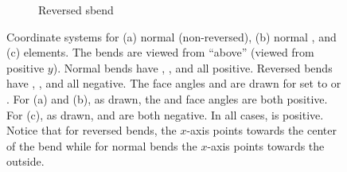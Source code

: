\begin{figure}[tb]
\begin{subfigure}[b]{0.32\textwidth}
    \caption{Reversed sbend}
    \label{f:sbend.rev}
  \end{subfigure}
  \hfill
  \caption[Coordinate systems for rbend and sbend elements.]
  { 
Coordinate systems for (a) normal (non-reversed), (b) normal , and (c)
 elements. The bends are viewed from ``above'' (viewed from positive $y$).
Normal bends have , , and  all positive. Reversed bends have ,
, and  all negative. The face angles  and  are drawn for
 set to  or . For (a) and (b), as drawn, the  and  face
angles are both positive. For (c), as drawn,  and  are both negative. In all cases,
 is positive. Notice that for reversed bends, the $x$-axis points towards the center of the
bend while for normal bends the $x$-axis points towards the outside.
  }
  \label{f:bend}
\end{figure}

